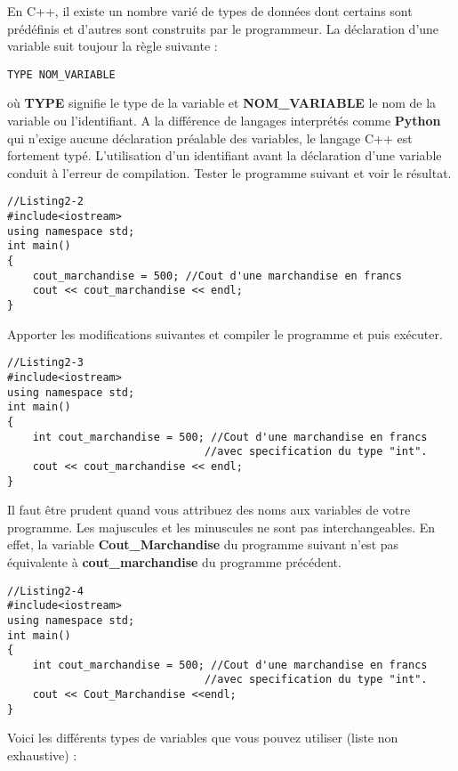 \documentclass[a4paper, oneside,11pt]{book}
\begin{document}
En C++, il existe un nombre vari\'e de types de donn\'ees dont certains sont pr\'ed\'efinis et d'autres sont construits par le programmeur.  La d\'eclaration
 d'une variable suit toujour la r\`egle suivante : 

\begin{lstlisting}
TYPE NOM_VARIABLE
\end{lstlisting}
o\`u \textbf{TYPE} signifie le type de la variable et \textbf{NOM\_VARIABLE} le nom de la variable ou l'identifiant. A la diff\'erence de langages 
interpr\'et\'es comme \textbf{Python} qui n'exige aucune d\'eclaration pr\'ealable des variables, le langage C++ est fortement typ\'e. L'utilisation 
d'un identifiant avant la d\'eclaration d'une variable conduit \`a l'erreur de compilation. Tester le programme suivant et voir le r\'esultat.

\begin{lstlisting}
//Listing2-2
#include<iostream>
using namespace std;
int main()
{
    cout_marchandise = 500; //Cout d'une marchandise en francs
    cout << cout_marchandise << endl;
}
\end{lstlisting}
Apporter les modifications suivantes et compiler le programme et puis ex\'ecuter.

\begin{lstlisting}
//Listing2-3
#include<iostream>
using namespace std;
int main()
{
    int cout_marchandise = 500; //Cout d'une marchandise en francs
                               //avec specification du type "int".
    cout << cout_marchandise << endl;
}
\end{lstlisting}



Il faut \^etre prudent quand vous attribuez des noms aux variables de votre programme. Les majuscules et les minuscules ne sont pas interchangeables. En effet, la variable
\textbf{Cout\_Marchandise} du programme suivant n'est pas \'equivalente \`a \textbf{cout\_marchandise} du programme pr\'ec\'edent.


\begin{lstlisting}
//Listing2-4
#include<iostream>
using namespace std;
int main()
{
    int cout_marchandise = 500; //Cout d'une marchandise en francs
                               //avec specification du type "int".
    cout << Cout_Marchandise <<endl;
}
\end{lstlisting}



Voici les diff\'erents types de variables que vous pouvez utiliser (liste non exhaustive) :
\end{document}
